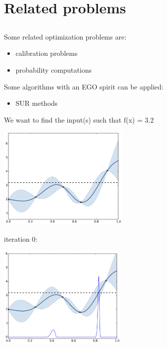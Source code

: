 \documentclass{beamer}
\begin{document}
\section[Related problems]{Related problems}
\subsection{}

\begin{frame}{}
Some related optimization problems are:
\begin{itemize}
	\item calibration problems
	\item probability computations
\end{itemize}
\vspace{8mm}
Some algorithms with an EGO spirit can be applied:
\begin{itemize}
 	\item SUR methods
 \end{itemize} 
\end{frame}

\begin{frame}{}
We want to find the input(s) such that f(x) = 3.2
\begin{center}
\includegraphics[height=5cm]{figures/python/inv}
\end{center}
\end{frame}

\begin{frame}[noframenumbering]{}
iteration 0: 
\begin{center}
\includegraphics[height=5cm]{figures/python/invproba}
\end{center}
\end{frame}
\end{document}
